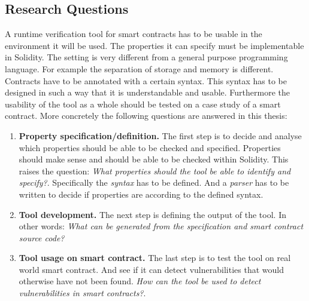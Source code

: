 \documentclass[a4paper]{article}
\begin{document}
\subsection{Research Questions}
A runtime verification tool for smart contracts has to be usable in the environment it will be used. The properties it can specify must be implementable in Solidity. The setting is very different from a general purpose programming language. For example the separation of storage and memory is different. Contracts have to be annotated with a certain syntax. This syntax has to be designed in such a way that it is understandable and usable. Furthermore the usability of the tool as a whole should be tested on a case study of a smart contract.
More concretely the following questions are answered in this thesis:
\begin{enumerate}
\item \textbf{Property specification/definition.}
The first step is to decide and analyse which properties should be able to be checked and specified. Properties should make sense and should be able to be checked within Solidity. This raises the question:
\textit{What properties should the tool be able to identify and specify?}. Specifically the \textit{syntax} has to be defined. And a \textit{parser} has to be written to decide if properties are according to the defined syntax. 
\item \textbf{Tool development.}
The next step is defining the output of the tool. In other words: \textit{What can be generated from the specification and smart contract source code?}
\item \textbf{Tool usage on smart contract.}
The last step is to test the tool on real world smart contract. And see if it can detect vulnerabilities that would otherwise have not been found. \textit{How can the tool be used to detect vulnerabilities in smart contracts?}.
\end{enumerate}
\end{document}
